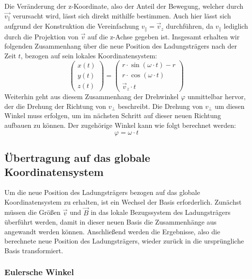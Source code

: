 Die Ver\"anderung der z-Koordinate, also der Anteil der Bewegung, welcher durch \(\vec{v_\parallel}\) verursacht wird, l\"asst sich
direkt mithilfe  bestimmen. Auch hier l\"asst sich aufgrund der Konstruktion die Vereinfachung
\(v_\parallel = \vec{v}_z\) durchf\"uhren, da \(v_\parallel\) lediglich durch die Projektion von \(\vec{v}\) auf die z-Achse gegeben ist.
Insgesamt erhalten wir folgenden Zusammenhang \"uber die neue Position des
Ladungstr\"agers nach der Zeit \(t\), bezogen auf sein lokales Koordinatensystem:
\begin{equation}
  \begin{pmatrix}
    x(t) \\
    y(t) \\
    z(t)
  \end{pmatrix}
  =
  \begin{pmatrix}
    r \cdot \sin{\left(\omega \cdot t\right)} - r \\
    r \cdot \cos{\left(\omega \cdot t\right)} \\
    \vec{v}_z \cdot t
  \end{pmatrix}
\end{equation}
Weiterhin geht aus diesem Zusammenhang der Drehwinkel \(\varphi\) unmittelbar hervor, der die Drehung der Richtung von \(v_\perp\)
beschreibt. Die Drehung von \(v_\perp\) um diesen Winkel muss erfolgen, um im n\"achsten Schritt auf dieser neuen Richtung aufbauen
zu k\"onnen. Der zugeh\"orige Winkel kann wie folgt berechnet werden:
\begin{equation}
  \label{eq:phi}
  \varphi = \omega \cdot t
\end{equation}

\subsection{\"Ubertragung auf das globale Koordinatensystem}

Um die neue Position des Ladungstr\"agers bezogen auf das globale Koordinatensystem zu erhalten, ist ein Wechsel der Basis erforderlich.
Zun\"achst m\"ussen die Gr\"o{\ss}en \(\vec{v}\) und \(\vec{B}\) in das lokale Bezugssystem des Ladungstr\"agers \"uberf\"uhrt werden,
damit in dieser neuen Basis die Zusammenh\"ange aus  angewandt werden k\"onnen. Anschlie{\ss}end werden
die Ergebnisse, also die berechnete neue Position des Ladungstr\"agers, wieder zur\"uck in die urspr\"ungliche Basis transformiert.

\subsubsection{Eulersche Winkel}

